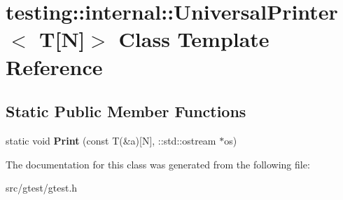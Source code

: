 \hypertarget{classtesting_1_1internal_1_1_universal_printer_3_01_t[_n]_4}{}\section{testing\+:\+:internal\+:\+:Universal\+Printer$<$ T\mbox{[}N\mbox{]}$>$ Class Template Reference}
\label{classtesting_1_1internal_1_1_universal_printer_3_01_t[_n]_4}
\subsection*{Static Public Member Functions}
\begin{DoxyCompactItemize}
\item 
\mbox{\label{classtesting_1_1internal_1_1_universal_printer_3_01_t[_n]_4_a1cf0e7c8db59c090f769116c6421b212}} 
static void {\bfseries Print} (const T(\&a)\mbox{[}N\mbox{]}, \+::std\+::ostream $\ast$os)
\end{DoxyCompactItemize}


The documentation for this class was generated from the following file\+:\begin{DoxyCompactItemize}
\item 
src/gtest/gtest.\+h\end{DoxyCompactItemize}
